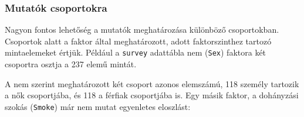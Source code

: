 \documentclass[
]{book}
\newenvironment{Shaded}{\begin{snugshade}}{\end{snugshade}}
\newcommand{\AttributeTok}[1]{\textcolor[rgb]{0.77,0.63,0.00}{#1}}
\newcommand{\CommentTok}[1]{\textcolor[rgb]{0.56,0.35,0.01}{\textit{#1}}}
\newcommand{\FunctionTok}[1]{\textcolor[rgb]{0.00,0.00,0.00}{#1}}
\newcommand{\NormalTok}[1]{#1}
\newcommand{\SpecialCharTok}[1]{\textcolor[rgb]{0.00,0.00,0.00}{#1}}
\newcommand{\StringTok}[1]{\textcolor[rgb]{0.31,0.60,0.02}{#1}}
\begin{document}
\begin{Shaded}
\end{Shaded}

\hypertarget{mutatuxf3k-csoportokra}{%
\subsubsection{Mutatók csoportokra}\label{mutatuxf3k-csoportokra}}

Nagyon fontos lehetőség a mutatók meghatározása különböző csoportokban. Csoportok alatt a faktor által meghatározott, adott faktorszinthez tartozó mintaelemeket értjük. Például a \texttt{survey} adattábla nem (\texttt{Sex}) faktora két csoportra osztja a 237 elemű mintát.

\begin{Shaded}
\end{Shaded}

A nem szerint meghatározott két csoport azonos elemszámú, 118 személy tartozik a nők csoportjába, és 118 a férfiak csoportjába is. Egy másik faktor, a dohányzási szokás (\texttt{Smoke}) már nem mutat egyenletes eloszlást:
\end{document}
